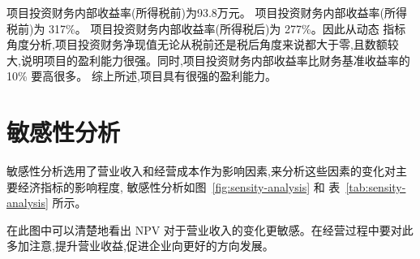 项目投资财务内部收益率(所得税前)为93.8万元。
项目投资财务内部收益率(所得税前)为 317\%。
项目投资财务内部收益率(所得税后)为 277\%。因此从动态
指标角度分析,项目投资财务净现值无论从税前还是税后角度来说都大于零,且数额较
大,说明项目的盈利能力很强。同时,项目投资财务内部收益率比财务基准收益率的 10\%
要高很多。
综上所述,项目具有很强的盈利能力。

\section{敏感性分析}
敏感性分析选用了营业收入和经营成本作为影响因素,来分析这些因素的变化对主
要经济指标的影响程度, 敏感性分析如图~\ref{fig:sensity-analysis} 和
表~\ref{tab:sensity-analysis} 所示。


在此图中可以清楚地看出 NPV 对于营业收入的变化更敏感。在经营过程中要对此
多加注意,提升营业收益,促进企业向更好的方向发展。
